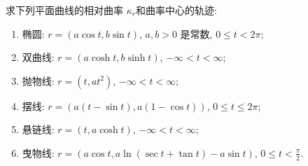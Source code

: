 \documentclass[../../main.tex]{subfiles}%
\begin{document}
\begin{example}
求下列平面曲线的相对曲率 $\kappa_r$和曲率中心的轨迹:
\begin{enumerate}[(1)]
\item 椭圆: $r=(a\cos t,b\sin t)$, $a,b>0$ 是常数, $0\leqslant t<2\pi$;
\item 双曲线: $r=(a\cosh t,b\sinh t)$, $-\infty<t<\infty$;
\item 抛物线: $r=(t,at^2)$, $-\infty<t<\infty$;
\item 摆线: $r=(a(t-\sin t),a(1-\cos t))$, $0\leqslant t\leqslant 2\pi$;
\item 悬链线: $r=(t,a\cosh t)$, $-\infty<t<\infty$;
\item 曳物线: $r=(a\cos t,a\ln(\sec t+\tan t)-a\sin t)$, $0\leqslant t<\frac{\pi}{2}$.
\end{enumerate}
\end{example}
\end{document}
